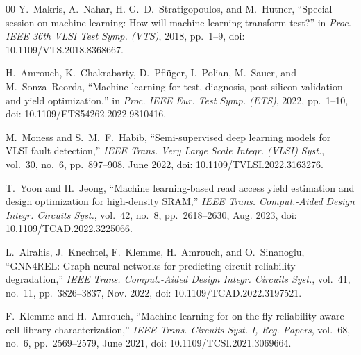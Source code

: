 \documentclass[conference]{IEEEtran}
\begin{document}
\begin{thebibliography}{00}
Y.~Makris, A.~Nahar, H.-G.~D.~Stratigopoulos, and M.~Hutner, ``Special session on machine learning: How will machine learning transform test?'' in \emph{Proc. IEEE 36th VLSI Test Symp. (VTS)}, 2018, pp.~1--9, doi: 10.1109/VTS.2018.8368667.

H.~Amrouch, K.~Chakrabarty, D.~Pfl\"uger, I.~Polian, M.~Sauer, and M.~Sonza~Reorda, ``Machine learning for test, diagnosis, post-silicon validation and yield optimization,'' in \emph{Proc. IEEE Eur. Test Symp. (ETS)}, 2022, pp.~1--10, doi: 10.1109/ETS54262.2022.9810416.

M.~Moness and S.~M.~F.~Habib, ``Semi-supervised deep learning models for VLSI fault detection,'' \emph{IEEE Trans. Very Large Scale Integr. (VLSI) Syst.}, vol.~30, no.~6, pp.~897--908, June 2022, doi: 10.1109/TVLSI.2022.3163276.

T.~Yoon and H.~Jeong, ``Machine learning-based read access yield estimation and design optimization for high-density SRAM,'' \emph{IEEE Trans. Comput.-Aided Design Integr. Circuits Syst.}, vol.~42, no.~8, pp.~2618--2630, Aug. 2023, doi: 10.1109/TCAD.2022.3225066.

L.~Alrahis, J.~Knechtel, F.~Klemme, H.~Amrouch, and O.~Sinanoglu, ``GNN4REL: Graph neural networks for predicting circuit reliability degradation,'' \emph{IEEE Trans. Comput.-Aided Design Integr. Circuits Syst.}, vol.~41, no.~11, pp.~3826--3837, Nov. 2022, doi: 10.1109/TCAD.2022.3197521.

F.~Klemme and H.~Amrouch, ``Machine learning for on-the-fly reliability-aware cell library characterization,'' \emph{IEEE Trans. Circuits Syst. I, Reg. Papers}, vol.~68, no.~6, pp.~2569--2579, June 2021, doi: 10.1109/TCSI.2021.3069664.

\end{thebibliography}
\end{document}
